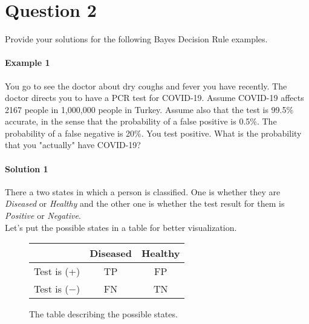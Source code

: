 \documentclass[12pt]{article}
\begin{document}
\begin{center}
    \texttt{}
\end{center}



\pagebreak
\section{Question 2}\label{sec:q2}
Provide your solutions for the following Bayes Decision Rule examples.
\paragraph{Example 1}
You go to see the doctor about dry coughs and fever you have recently. The doctor directs you to have a PCR test for COVID-19.  Assume COVID-19 affects 2167 people in 1,000,000 people in Turkey. Assume also that the test is 99.5\% accurate, in the sense that the probability of a false positive is 0.5\%. The probability of a false negative is 20\%. You test positive. What is the probability that you "actually" have COVID-19?

\paragraph{Solution 1}
There a two states in which a person is classified. 
One is whether they are \textit{Diseased} or \textit{Healthy} and the other 
one is whether the test result for them is \textit{Positive} or \textit{Negative}. \\

Let's put the possible states in a table for better visualization.
\newcommand\ddfrac[2]{\frac{\displaystyle #1}{\displaystyle #2}}




\begin{figure}[h]
    \centering
    \begin{center}
        \begin{tabular}{|c|c|c|} 
         \hline
          & Diseased & Healthy \\ 
         \hline
         Test is (+) & TP & FP \\ 
         \hline
         Test is (\(-\)) & FN & TN \\ 
         \hline
        \end{tabular}
    \end{center}
    \caption{The table describing the possible states.}
    \label{table1}
\end{figure}
\end{document}
